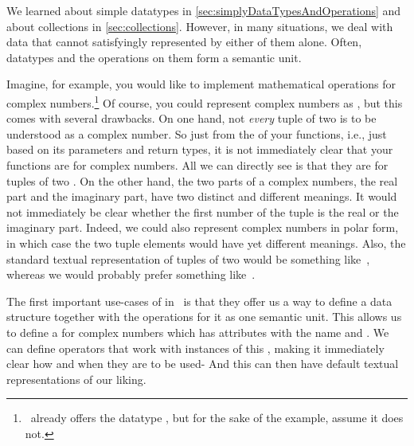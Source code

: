 %
%
We learned about simple datatypes in \cref{sec:simplyDataTypesAndOperations} and about collections in \cref{sec:collections}.
However, in many situations, we deal with data that cannot satisfyingly represented by either of them alone.
Often, datatypes and the operations on them form a semantic unit.

Imagine, for example, you would like to implement mathematical operations for complex numbers.\footnote{%
\python\ already offers the datatype , but for the sake of the example, assume it does not.}
Of course, you could represent complex numbers as , but this comes with several drawbacks.
On one hand, not \emph{every} tuple of two  is to be understood as a complex number.
So just from the  of your functions, i.e., just based on its parameters and return types, it is not immediately clear that your functions are for complex numbers.
All we can directly see is that they are for tuples of two .
On the other hand, the two parts of a complex numbers, the real part and the imaginary part, have two distinct and different meanings.
It would not immediately be clear whether the first number of the tuple is the real or the imaginary part.
Indeed, we could also represent complex numbers in polar form, in which case the two tuple elements would have yet different meanings.
Also, the standard textual representation of tuples of two  would be something like~, whereas we would probably prefer something like~.

The first important use-cases of  in \python\ is that they offer us a way to define a data structure together with the operations for it as one semantic unit.
This allows us to define a  for complex numbers which has attributes with the name  and .
We can define operators that work with instances of this , making it immediately clear how and when they are to be used-
And this  can then have default textual representations of our liking.

